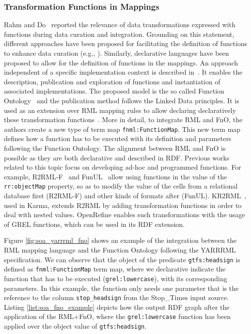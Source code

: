 \subsubsection{Transformation Functions in Mappings}
\label{soa2:functions}
Rahm and Do~\citep{rahm2000data} reported the relevance of data transformations expressed with functions during data curation and integration. Grounding on this statement, different approaches have been proposed for facilitating the definition of functions to enhance data curation (e.g., \citep{galhardas2001declarative,GuptaSKGTM12,raman2001potter}). Similarly, declarative languages have been proposed to allow for the definition of functions in the mappings. An approach independent of a specific implementation context is described in~\citep{demeester2019implementation}. It enables the description, publication and exploration of functions and instantiation of associated implementations. The proposed model is the so called Function Ontology~\citep{de2016ontology} and the publication method follows the Linked Data principles. It is used as an extension over RML mapping rules to allow declaring declaratively these transformation functions~\citep{de2017declarative}. More in detail, to integrate RML and FnO, the authors create a new type of term map \texttt{fnml:FunctionMap}. This new term map defines how a function has to be executed with its definition and parameters following the Function Ontology. The alignment between RML and FnO is possible as they are both declarative and described in RDF. Previous works related to this topic focus on developing ad-hoc and programmed functions. For example, R2RML-F~\citep{debruyne2016r2rml} and FunUL~\citep{junior2016funul,junior2016incorporating} allow using functions in the value of the \texttt{rr:objectMap} property, so as to modify the value of the cells from a relational database first (R2RML-F) and other kinds of formats after (FunUL). KR2RML~\citep{slepicka2015kr2rml}, used in Karma, extends R2RML by adding transformation functions in order to deal with nested values. OpenRefine enables such transformations with the usage of GREL functions, which can be used in its RDF extension. 


Figure \ref{fig:soa_yarrrml_fno} shows an example of the integration between the RML mapping language and the Function Ontology following the YARRRML specification. We can observe that the object of the predicate \texttt{gtfs:headsign} is defined as \texttt{fnml:FunctionMap} term map, where we declarative indicate the function that has to be executed (\texttt{grel:lowercase}), with its corresponding parameters. In this example, the function only needs one parameter that is the reference to the column \texttt{stop\_headsign} from the Stop\_Times input source. Listing \ref{list:soa_fno_example} depicts how the output RDF graph after the application of the RML+FnO, where the \texttt{grel:lowercase} function has been applied over the object value of \texttt{gtfs:headsign}.


